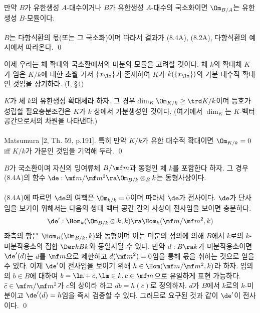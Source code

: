 	
	\begin{corollary}
	만약 $B$가 유한생성 $A$-대수이거나 $B$가 유한생성 $A$-대수의 국소화이면 $\Om_{B/A}$는 유한생성 $B$-모듈이다.\\\\
	\pf $B$는 다항식환의 몫(또는 그 국소화)이며 따라서 결과가 (8.4A), (8.2A), 다항식환의 예시에서 따라온다.
	\qed
	\end{corollary}
	
	이제 우리는 체 확대와 국소환에서의 미분의 모듈을 고려할 것이다. 체 $k$의 확대체 $K$가 임은
	$K/k$에 대한 초월 기저 $\{x_\lm\}$가 존재하여 $K$가 $k(\{x_\lm\})$의 가분 대수적 확대인 것임을 상기하라. (I, \S 4)
	
	
	\begin{theorema}
	$K$가 체 $k$의 유한생성 확대체라 하자. 그 경우 $\dim_K\Om_{K/k}\ge\trd K/k$이며 등호가 성립할 필요충분조건은
	$K$가 $k$ 상에서 가분생성인 것이다. (여기에서 $\dim_K$는 $K$-벡터 공간으로서의 차원을 나타낸다.)\\\\
	\pf Matsumura [2, Th. 59, p.191]. 특히 만약 $K/k$가 유한 대수적 확대이면 $\Om_{K/k}=0$ iff $K/k$가 가분인 것임을 기억해 두라.
	\qed
	\end{theorema}
	
	
	\begin{proposition}
	$B$가 국소환이며 자신의 잉여류체 $B/\mf m$과 동형인 체 $k$를 포함한다 하자.
	그 경우 (8.4A)의 함수 $\de:\mf m/\mf m^2\ra\Om_{B/k}\otimes_Bk$는 동형사상이다.\\\\
	\pf (8.4A)에 따르면 $\de$의 여핵은 $\Om_{k/k}=0$이며 따라서 $\de$가 전사이다.
	$\de$가 단사임을 보기이 위해서는 다음의 쌍대 벡터 공간 간의 사상이 전사임을 보이면 충분하다.
	$$\de':\Hom_k(\Om_{B/k}\otimes k,k)\ra\Hom_k(\mf m/\mf m^2,k)$$
	좌측의 항은 $\Hom_B(\Om_{B/k},k)$와 동형이며 이는 미분의 정의에 의해
	$B$에서 $k$로의 $k$-미분작용소의 집합 $\Der kBk$와 동일시될 수 있다.
	만약 $d:B\ra k$가 미분작용소이면 $\de'(d)$는 $d$를 $\mf m$으로 제한하고 $d(\mf m^2)=0$임을 통해 몫을 취하는 것으로 얻을 수 있다.
	이제 $\de'$이 전사임을 보이기 위해 $h\in\Hom(\mf m/\mf m^2,k)$라 하자.
	임의의 $b\in B$에 대하여 $b=\lm+c,\lm\in k,c\in\mf m$으로 유일하게 표현 가능하다.
	$\bar c\in\mf m/\mf m^2$가 $c$의 상이라 하고 $db=h(\bar c)$로 정의하자.
	$d$가 $B$에서 $k$로의 $k$-미분이고 $\de'(d)=h$임을 즉시 검증할 수 있다. 그러므로 요구된 것과 같이 $\de'$이 전사이다.
	\qed
	\end{proposition}
	
